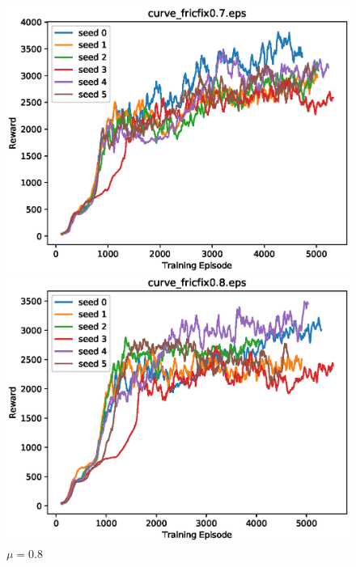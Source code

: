 \begin{figure}[p]
 \begin{minipage}{0.49\hsize}
  \begin{center}
 \includegraphics[width=.99\linewidth]{./fig/curve_fricfix0.7.eps}
  \caption{$\mu=0.7$
  }
  \end{center}
 \end{minipage}
 \begin{minipage}{0.49\hsize}
   \begin{center}
 \includegraphics[width=.99\linewidth]{./fig/curve_fricfix0.8.eps}
  \caption{$\mu=0.8$
     }
  \end{center}
 \end{minipage}
\end{figure}

